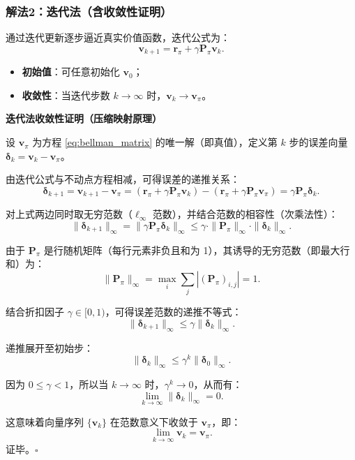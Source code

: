 \documentclass[UTF8]{article}
\begin{document}
\subsubsection*{解法2：迭代法（含收敛性证明）}
通过迭代更新逐步逼近真实价值函数，迭代公式为：
\[
  \boldsymbol{v}_{k+1} = \boldsymbol{r}_\pi + \gamma \boldsymbol{P}_\pi \boldsymbol{v}_k.
\]
\begin{itemize}
  \item \textbf{初始值}：可任意初始化 $\boldsymbol{v}_0$；
  \item \textbf{收敛性}：当迭代步数 $k \to \infty$ 时，$\boldsymbol{v}_k \to \boldsymbol{v}_\pi$。
\end{itemize}

\begin{proofbox}
  \textbf{迭代法收敛性证明（压缩映射原理）}
  
  设 $\boldsymbol{v}_\pi$ 为方程 \eqref{eq:bellman_matrix} 的唯一解（即真值），定义第 $k$ 步的误差向量 $\boldsymbol{\delta}_k = \boldsymbol{v}_k - \boldsymbol{v}_\pi$。

  由迭代公式与不动点方程相减，可得误差的递推关系：
  \[
    \boldsymbol{\delta}_{k+1} = \boldsymbol{v}_{k+1} - \boldsymbol{v}_\pi
    = \left(\boldsymbol{r}_\pi + \gamma \boldsymbol{P}_\pi \boldsymbol{v}_k\right)
    - \left(\boldsymbol{r}_\pi + \gamma \boldsymbol{P}_\pi \boldsymbol{v}_\pi\right)
    = \gamma \boldsymbol{P}_\pi \boldsymbol{\delta}_k .
  \]

  对上式两边同时取无穷范数（$\ell_\infty$ 范数），并结合范数的相容性（次乘法性）：
  \[
    \| \boldsymbol{\delta}_{k+1} \|_\infty
    = \| \gamma \boldsymbol{P}_\pi \boldsymbol{\delta}_k \|_\infty
    \le \gamma \cdot \| \boldsymbol{P}_\pi \|_\infty \cdot \| \boldsymbol{\delta}_k \|_\infty .
  \]

  由于 $\boldsymbol{P}_\pi$ 是行随机矩阵（每行元素非负且和为 1），其诱导的无穷范数（即最大行和）为：
  \[
    \| \boldsymbol{P}_\pi \|_\infty = \max_{i} \sum_{j} |(\boldsymbol{P}_\pi)_{i,j}| = 1 .
  \]

  结合折扣因子 $\gamma \in [0,1)$，可得误差范数的递推不等式：
  \[
    \| \boldsymbol{\delta}_{k+1} \|_\infty \le \gamma \| \boldsymbol{\delta}_k \|_\infty .
  \]

  递推展开至初始步：
  \[
    \| \boldsymbol{\delta}_k \|_\infty \le \gamma^k \| \boldsymbol{\delta}_0 \|_\infty .
  \]

  因为 $0 \le \gamma < 1$，所以当 $k \to \infty$ 时，$\gamma^k \to 0$，从而有：
  \[
    \lim_{k \to \infty} \| \boldsymbol{\delta}_k \|_\infty = 0 .
  \]

  这意味着向量序列 $\{\boldsymbol{v}_k\}$ 在范数意义下收敛于 $\boldsymbol{v}_\pi$，即：
  \[
    \lim_{k \to \infty} \boldsymbol{v}_k = \boldsymbol{v}_\pi .
  \]
  证毕。\hfill $\square$
\end{proofbox}
\end{document}
